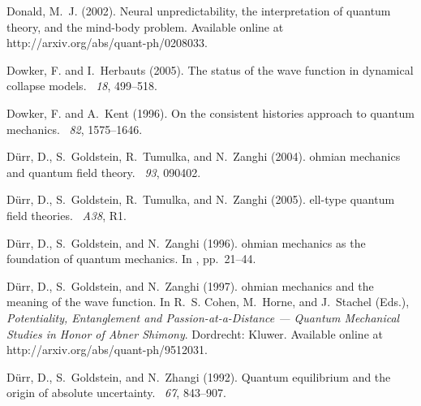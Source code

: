 \documentclass[12pt]{article}
\begin{document}
\begin{thebibliography}{}
Donald, M.~J. (2002).
\newblock Neural unpredictability, the interpretation of quantum theory, and
  the mind-body problem.
\newblock Available online at http://arxiv.org/abs/quant-ph/0208033.

Dowker, F. and I.~Herbauts (2005).
\newblock The status of the wave function in dynamical collapse models.
~{\em 18}, 499--518.

Dowker, F. and A.~Kent (1996).
\newblock On the consistent histories approach to quantum mechanics.
~{\em 82}, 1575--1646.

D{\"u}rr, D., S.~Goldstein, R.~Tumulka, and N.~Zanghi (2004).
ohmian mechanics and quantum field theory.
~{\em 93}, 090402.

D{\"u}rr, D., S.~Goldstein, R.~Tumulka, and N.~Zanghi (2005).
ell-type quantum field theories.
~{\em A38}, R1.

D{\"u}rr, D., S.~Goldstein, and N.~Zanghi (1996).
ohmian mechanics as the foundation of quantum mechanics.
\newblock In , pp.\  21--44.

D{\"u}rr, D., S.~Goldstein, and N.~Zanghi (1997).
ohmian mechanics and the meaning of the wave function.
\newblock In R.~S. Cohen, M.~Horne, and J.~Stachel (Eds.), {\em Potentiality,
  Entanglement and Passion-at-a-Distance --- Quantum Mechanical Studies in
  Honor of {A}bner {S}himony}. Dordrecht: Kluwer.
\newblock Available online at http://arxiv.org/abs/quant-ph/9512031.

D{\"u}rr, D., S.~Goldstein, and N.~Zhangi (1992).
\newblock Quantum equilibrium and the origin of absolute uncertainty.
~{\em 67}, 843--907.


\end{thebibliography}
\end{document}
